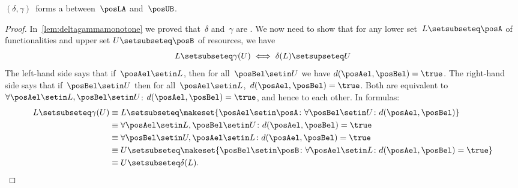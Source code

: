 \begin{lemma}\label{lem:deltagamma-monotone-galois}
    $(\delta, \gamma)$~forms a  between~$\posLA$ and~$\posUB$.
\end{lemma}
\begin{proof}
    In~\cref{lem:deltagammamonotone} we proved that~$\delta$ and~$\gamma$ are .
    We now need to show that for any lower set~$L\setsubseteq \posA$ of functionalities and upper set $U\setsubseteq \posB$ of resources, we have
    \begin{equation}
        L\setsubseteq\gamma(U) \iff \delta(L)\setsupseteq U
    \end{equation}
    The left-hand side says that if~$\posAel\setin L$, then for all~$\posBel \setin U$ we have $d(\posAel,\posBel)=\true$.
    The right-hand side says that if~$\posBel\setin U$ then for all~$\posAel \setin L$,~$d(\posAel,\posBel)=\true$.
    Both are equivalent to~$\forall \posAel\setin L,\posBel\setin U$: $d(\posAel,\posBel)=\true$, and hence to each other.
    In formulas:
    \begin{equation}
        \begin{aligned}
            L \setsubseteq \gamma(U) & \equiv L\setsubseteq \makeset{\posAel \setin \posA\colon \forall \posBel\setin U\colon d(\posAel,\posBel)} \\
                                     & \equiv \forall \posAel\setin L, \posBel\setin U \colon d(\posAel,\posBel)=\true \\
                                     & \equiv \forall \posBel\setin U, \posAel\setin L \colon d(\posAel,\posBel)=\true \\
                                     & \equiv U\setsubseteq \makeset{\posBel\setin \posB\colon \forall \posAel\setin L\colon d(\posAel,\posBel)=\true } \\
                                     & \equiv U\setsubseteq \delta(L).
        \end{aligned}
    \end{equation}
\end{proof}
